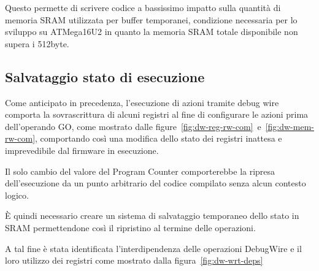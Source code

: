 Questo permette di scrivere codice a bassissimo impatto sulla quantità di memoria SRAM utilizzata per buffer temporanei, condizione necessaria per lo sviluppo su ATMega16U2 in quanto la memoria SRAM totale disponibile non supera i 512byte\cite{avr:m16u2}.

\subsection{Salvataggio stato di esecuzione}

Come anticipato in precedenza, l'esecuzione di azioni tramite debug wire comporta la sovrascrittura di alcuni registri al fine di configurare le azioni prima dell'operando GO, come mostrato dalle figure~\ref{fig:dw-reg-rw-com}~e~\ref{fig:dw-mem-rw-com}, comportando così una modifica dello stato dei registri inattesa e imprevedibile dal firmware in esecuzione.

Il solo cambio del valore del Program Counter comporterebbe la ripresa dell'esecuzione da un punto arbitrario del codice compilato senza alcun contesto logico.

È quindi necessario creare un sistema di salvataggio temporaneo dello stato in SRAM permettendone così il ripristino al termine delle operazioni.

A tal fine è stata identificata l'interdipendenza delle operazioni DebugWire e il loro utilizzo dei registri come mostrato dalla figura~\ref{fig:dw-wrt-deps}

